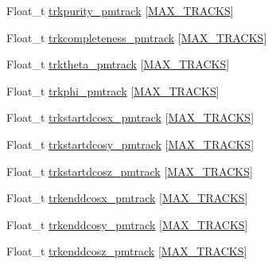 \begin{DoxyCompactItemize}
\item 
Float\-\_\-t \hyperlink{classanatree_a7c787dca7ecc8e5dc25a09f4b84cc6ed}{trkpurity\-\_\-pmtrack} \mbox{[}\hyperlink{anatree__core__v09410002__orig_8h_a327fd4e796e4a0d78947524c96e4362e}{M\-A\-X\-\_\-\-T\-R\-A\-C\-K\-S}\mbox{]}
\item 
Float\-\_\-t \hyperlink{classanatree_a904eca4d622f71d436025a3783d9a780}{trkcompleteness\-\_\-pmtrack} \mbox{[}\hyperlink{anatree__core__v09410002__orig_8h_a327fd4e796e4a0d78947524c96e4362e}{M\-A\-X\-\_\-\-T\-R\-A\-C\-K\-S}\mbox{]}
\item 
Float\-\_\-t \hyperlink{classanatree_a76982f5992329f79813fa15ea620fb03}{trktheta\-\_\-pmtrack} \mbox{[}\hyperlink{anatree__core__v09410002__orig_8h_a327fd4e796e4a0d78947524c96e4362e}{M\-A\-X\-\_\-\-T\-R\-A\-C\-K\-S}\mbox{]}
\item 
Float\-\_\-t \hyperlink{classanatree_a00019f5a4bc26a4853595fafa2964cc7}{trkphi\-\_\-pmtrack} \mbox{[}\hyperlink{anatree__core__v09410002__orig_8h_a327fd4e796e4a0d78947524c96e4362e}{M\-A\-X\-\_\-\-T\-R\-A\-C\-K\-S}\mbox{]}
\item 
Float\-\_\-t \hyperlink{classanatree_a947165a91b8bda0981d75d230094e253}{trkstartdcosx\-\_\-pmtrack} \mbox{[}\hyperlink{anatree__core__v09410002__orig_8h_a327fd4e796e4a0d78947524c96e4362e}{M\-A\-X\-\_\-\-T\-R\-A\-C\-K\-S}\mbox{]}
\item 
Float\-\_\-t \hyperlink{classanatree_aa6a223461862a75581054d6c5e139a17}{trkstartdcosy\-\_\-pmtrack} \mbox{[}\hyperlink{anatree__core__v09410002__orig_8h_a327fd4e796e4a0d78947524c96e4362e}{M\-A\-X\-\_\-\-T\-R\-A\-C\-K\-S}\mbox{]}
\item 
Float\-\_\-t \hyperlink{classanatree_aeb6ed771022d17477ea745f1200225b0}{trkstartdcosz\-\_\-pmtrack} \mbox{[}\hyperlink{anatree__core__v09410002__orig_8h_a327fd4e796e4a0d78947524c96e4362e}{M\-A\-X\-\_\-\-T\-R\-A\-C\-K\-S}\mbox{]}
\item 
Float\-\_\-t \hyperlink{classanatree_a372b3e3b4c13ac95a3c79db5ae540d41}{trkenddcosx\-\_\-pmtrack} \mbox{[}\hyperlink{anatree__core__v09410002__orig_8h_a327fd4e796e4a0d78947524c96e4362e}{M\-A\-X\-\_\-\-T\-R\-A\-C\-K\-S}\mbox{]}
\item 
Float\-\_\-t \hyperlink{classanatree_a2688fec0a4bdc0ee2f671c6f250f4e93}{trkenddcosy\-\_\-pmtrack} \mbox{[}\hyperlink{anatree__core__v09410002__orig_8h_a327fd4e796e4a0d78947524c96e4362e}{M\-A\-X\-\_\-\-T\-R\-A\-C\-K\-S}\mbox{]}
\item 
Float\-\_\-t \hyperlink{classanatree_afa667756a208ba832a307f4dd45db168}{trkenddcosz\-\_\-pmtrack} \mbox{[}\hyperlink{anatree__core__v09410002__orig_8h_a327fd4e796e4a0d78947524c96e4362e}{M\-A\-X\-\_\-\-T\-R\-A\-C\-K\-S}\mbox{]}

\end{DoxyCompactItemize}
